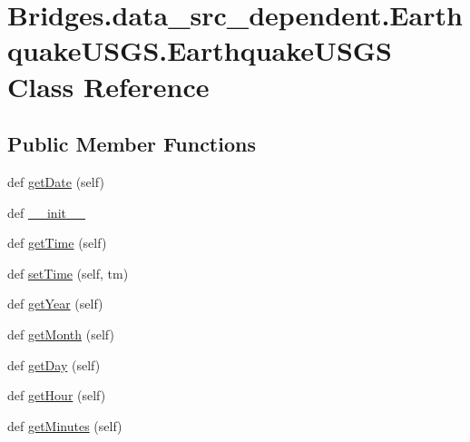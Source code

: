 \hypertarget{class_bridges_1_1data__src__dependent_1_1_earthquake_u_s_g_s_1_1_earthquake_u_s_g_s}{}\section{Bridges.\+data\+\_\+src\+\_\+dependent.\+Earthquake\+U\+S\+G\+S.\+Earthquake\+U\+S\+G\+S Class Reference}
\label{class_bridges_1_1data__src__dependent_1_1_earthquake_u_s_g_s_1_1_earthquake_u_s_g_s}
\subsection*{Public Member Functions}
\begin{DoxyCompactItemize}
\item 
def \hyperlink{class_bridges_1_1data__src__dependent_1_1_earthquake_u_s_g_s_1_1_earthquake_u_s_g_s_a6028ac23ea9a228824ae8d3638c2ac02}{get\+Date} (self)
\item 
def \hyperlink{class_bridges_1_1data__src__dependent_1_1_earthquake_u_s_g_s_1_1_earthquake_u_s_g_s_af65ee0c203a097bafde88d20694f6a0a}{\+\_\+\+\_\+init\+\_\+\+\_\+}
\item 
def \hyperlink{class_bridges_1_1data__src__dependent_1_1_earthquake_u_s_g_s_1_1_earthquake_u_s_g_s_a432d3e4b61601aeabe4ca3d1258fe3d6}{get\+Time} (self)
\item 
def \hyperlink{class_bridges_1_1data__src__dependent_1_1_earthquake_u_s_g_s_1_1_earthquake_u_s_g_s_aed8565370e2513573e1ceecdca6d3965}{set\+Time} (self, tm)
\item 
def \hyperlink{class_bridges_1_1data__src__dependent_1_1_earthquake_u_s_g_s_1_1_earthquake_u_s_g_s_ab64d331ca8bb389f0c3f10dd8e4bc0e9}{get\+Year} (self)
\item 
def \hyperlink{class_bridges_1_1data__src__dependent_1_1_earthquake_u_s_g_s_1_1_earthquake_u_s_g_s_a2f383cf0c572df48173e1078330039f8}{get\+Month} (self)
\item 
def \hyperlink{class_bridges_1_1data__src__dependent_1_1_earthquake_u_s_g_s_1_1_earthquake_u_s_g_s_a85abd4f9a03655ee09eac0d6f750d660}{get\+Day} (self)
\item 
def \hyperlink{class_bridges_1_1data__src__dependent_1_1_earthquake_u_s_g_s_1_1_earthquake_u_s_g_s_ac386abd94ac154dfe17224183121d97c}{get\+Hour} (self)
\item 
def \hyperlink{class_bridges_1_1data__src__dependent_1_1_earthquake_u_s_g_s_1_1_earthquake_u_s_g_s_a87a9d8e0ef27ac5f02bde938fd97bbd5}{get\+Minutes} (self)

\end{DoxyCompactItemize}
